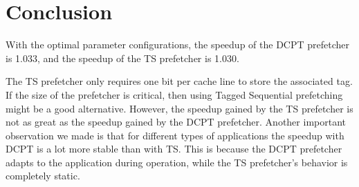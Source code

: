 \section{Conclusion}
With the optimal parameter configurations, the speedup of the 
DCPT prefetcher is 1.033, and the speedup of the TS prefetcher is 1.030.

The TS prefetcher only requires one bit per cache line to store
the associated tag. If the size of the prefetcher is critical, then using Tagged
Sequential prefetching might be a good alternative. However, the speedup gained
by the TS prefetcher is not as great as the speedup gained by the
DCPT prefetcher. Another important observation we made is that for different 
types of applications the speedup with DCPT is a lot more stable than with TS. 
This is because the DCPT prefetcher adapts to the application during operation, 
while the TS prefetcher's behavior is completely static. 


